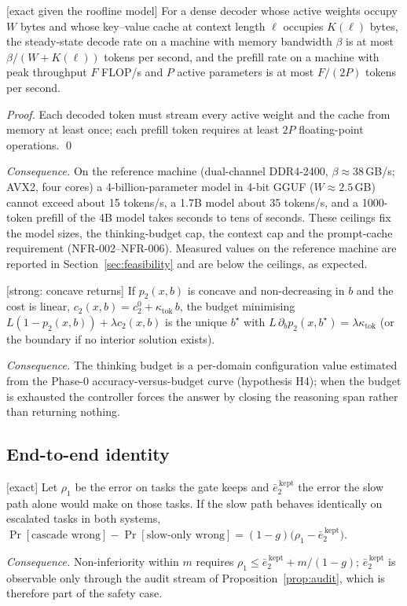 \begin{proposition} \textnormal{[exact given the
roofline model]}
\label{prop:roofline}
For a dense decoder whose active weights occupy $W$ bytes and whose key--value
cache at context length $\ell$ occupies $K(\ell)$ bytes, the steady-state
decode rate on a machine with memory bandwidth $\beta$ is at most
$\beta/(W+K(\ell))$ tokens per second, and the prefill rate on a machine with
peak throughput $F$ FLOP/s and $P$ active parameters is at most $F/(2P)$
tokens per second.
\end{proposition}
\begin{proof}
Each decoded token must stream every active weight and the cache from memory
at least once; each prefill token requires at least $2P$ floating-point
operations. \qed
\end{proof}
\emph{Consequence.} On the reference machine (dual-channel DDR4-2400,
$\beta\approx38$\,GB/s; AVX2, four cores) a 4-billion-parameter model in 4-bit
GGUF ($W\approx2.5$\,GB) cannot exceed about 15 tokens/s, a 1.7B model about
35 tokens/s, and a 1000-token prefill of the 4B model takes seconds to tens of
seconds. These ceilings fix the model sizes, the thinking-budget cap, the
context cap and the prompt-cache requirement (NFR-002--NFR-006). Measured
values on the reference machine are reported in Section~\ref{sec:feasibility}
and are below the ceilings, as expected.

\begin{proposition} \textnormal{[strong: concave returns]}
\label{prop:budget}
If $p_2(x,b)$ is concave and non-decreasing in $b$ and the cost is linear,
$c_2(x,b)=c_2^0+\kappa_{\text{tok}}\,b$, the budget minimising
$L(1-p_2(x,b))+\lambda c_2(x,b)$ is the unique $b^\star$ with
$L\,\partial_bp_2(x,b^\star)=\lambda\kappa_{\text{tok}}$ (or the boundary if
no interior solution exists).
\end{proposition}
\emph{Consequence.} The thinking budget is a per-domain configuration value
estimated from the Phase-0 accuracy-versus-budget curve (hypothesis H4);
when the budget is exhausted the controller forces the answer by closing the
reasoning span \cite{muennighoff2025s1} rather than returning nothing.

\subsection{End-to-end identity}

\begin{proposition} \textnormal{[exact]}
\label{prop:cascade}
Let $\rho_1$ be the error on tasks the gate keeps and $\bar e_2^{\,\text{kept}}$
the error the slow path alone would make on those tasks. If the slow path
behaves identically on escalated tasks in both systems,
$\Pr[\text{cascade wrong}]-\Pr[\text{slow-only wrong}]
=(1-g)\big(\rho_1-\bar e_2^{\,\text{kept}}\big)$.
\end{proposition}
\emph{Consequence.} Non-inferiority within $m$ requires
$\rho_1\le\bar e_2^{\,\text{kept}}+m/(1-g)$; $\bar e_2^{\,\text{kept}}$ is
observable only through the audit stream of Proposition~\ref{prop:audit}, which
is therefore part of the safety case.

